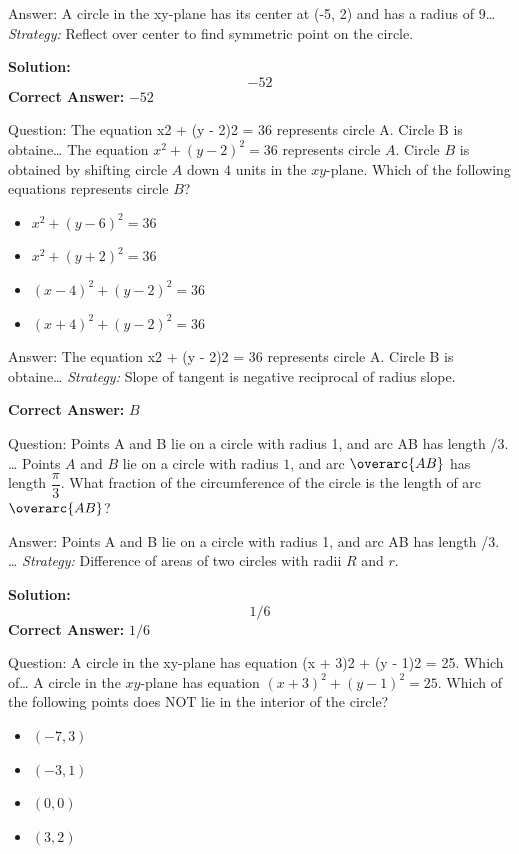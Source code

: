 \documentclass{beamer}
\begin{document}
\begin{frame}{Answer: A circle in the xy-plane has its center at (-5, 2) and has a radius of 9…}
\textit{Strategy:} Reflect over center to find symmetric point on the circle.

\textbf{Solution:}
\[ \boxed{-52} \]
\textbf{Correct Answer:} \( \boxed{-52} \)

\end{frame}
\begin{frame}{Question: The equation x2 + (y - 2)2 = 36 represents circle A. Circle B is obtaine…}
The equation $x^2 + (y - 2)^2 = 36$ represents circle $A$. Circle $B$ is obtained by shifting circle $A$ down $4$ units in the $xy$-plane. Which of the following equations represents circle $B$?
\begin{itemize}
    \item[\textbf{A.}] $x^2 + (y - 6)^2 = 36$
    \item[\textbf{B.}] $x^2 + (y + 2)^2 = 36$
    \item[\textbf{C.}] $(x - 4)^2 + (y - 2)^2 = 36$
    \item[\textbf{D.}] $(x + 4)^2 + (y - 2)^2 = 36$
\end{itemize}
\end{frame}
\begin{frame}{Answer: The equation x2 + (y - 2)2 = 36 represents circle A. Circle B is obtaine…}
\textit{Strategy:} Slope of tangent is negative reciprocal of radius slope.

\textbf{Correct Answer:} \( \boxed{B} \)

\end{frame}
\begin{frame}{Question: Points A and B lie on a circle with radius 1, and arc AB has length /3. …}
Points $A$ and $B$ lie on a circle with radius $1$, and arc $\overarc{AB}$ has length $\dfrac{\pi}{3}$. What fraction of the circumference of the circle is the length of arc $\overarc{AB}$?
\end{frame}
\begin{frame}{Answer: Points A and B lie on a circle with radius 1, and arc AB has length /3. …}
\textit{Strategy:} Difference of areas of two circles with radii $R$ and $r$.

\textbf{Solution:}
\[ \boxed{1/6} \]
\textbf{Correct Answer:} \( \boxed{1/6} \)

\end{frame}
\begin{frame}{Question: A circle in the xy-plane has equation (x + 3)2 + (y - 1)2 = 25. Which of…}
A circle in the $xy$-plane has equation $(x + 3)^2 + (y - 1)^2 = 25$. Which of the following points does NOT lie in the interior of the circle?
\begin{itemize}
    \item[\textbf{A.}] $(-7, 3)$
    \item[\textbf{B.}] $(-3, 1)$
    \item[\textbf{C.}] $(0, 0)$
    \item[\textbf{D.}] $(3, 2)$
\end{itemize}
\end{frame}
\end{document}
